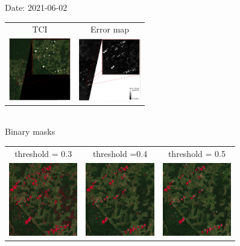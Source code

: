 \documentclass{beamer}
\begin{document}
\begin{frame}{Date: 2021-06-02}
    \centering
        \begin{tabular}{cc}
        TCI & Error map\\
        \includegraphics[width=2.7cm]{Figures/v3/20210602/TCI/tci_zoom1.pdf}
        &
        \includegraphics[width=2.7cm]{Figures/v3/20210602/error_map/error_zoom1.pdf}
    \end{tabular}
    \\
   \centering
    Binary masks
        \begin{tabular}{ccc}
            threshold = 0.3  & threshold =0.4 &  threshold = 0.5 \\
        \includegraphics[width=3cm]{Figures/v3/20210602/umbral_03/zoom1.png}
        &
        \includegraphics[width=3cm]{Figures/v3/20210602/umbral_04/zoom1.png}
        &
        \includegraphics[width=3cm]{Figures/v3/20210602/umbral_05/zoom1.png}
        \end{tabular}
\end{frame}
\end{document}
